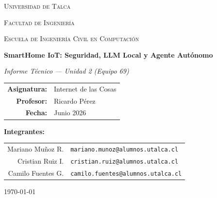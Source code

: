 \documentclass[12pt,letterpaper]{article}
\begin{document}
\begin{titlepage}
    \centering
    \vspace*{1cm}
    {\scshape\LARGE Universidad de Talca \par}
    {\scshape\Large Facultad de Ingeniería \par}
    {\scshape\large Escuela de Ingeniería Civil en Computación \par}
    \vspace{1.5cm}
    {\huge\bfseries SmartHome IoT: Seguridad, LLM Local y Agente Autónomo\par}
    \vspace{0.5cm}
    {\Large\itshape Informe Técnico — Unidad 2 (Equipo 69)\par}
    \vspace{2cm}

    \begin{tabular}{rl}
        \textbf{Asignatura:} & Internet de las Cosas \\
        \textbf{Profesor:} & Ricardo Pérez \\
        \textbf{Fecha:} & Junio 2026 \\
    \end{tabular}

    \vspace{1.5cm}
    {\large\textbf{Integrantes:}\par}
    \begin{tabular}{rl}
        Mariano Muñoz R. & \mbox{\texttt{mariano.munoz@alumnos.utalca.cl}} \\
        Cristian Ruiz I. & \mbox{\texttt{cristian.ruiz@alumnos.utalca.cl}} \\
        Camilo Fuentes G. & \mbox{\texttt{camilo.fuentes@alumnos.utalca.cl}} \\
    \end{tabular}

    \vfill
    {\large \today \par}
\end{titlepage}

\newpage

\tableofcontents
\newpage

\listoffigures
\listoftables
\newpage
\end{document}

